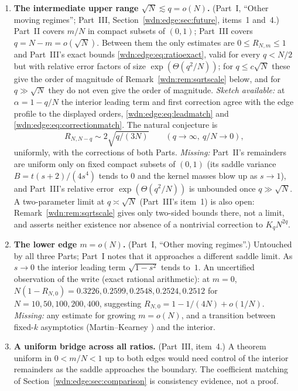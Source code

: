 \documentclass[11pt,letterpaper]{article}
\theoremstyle{remark}\newtheorem{remark}[theorem]{Remark}
\begin{document}
\begin{enumerate}[label=\textbf{\arabic*.},ref=\arabic*,leftmargin=*]
\item\label{wdn:q:gap} \textbf{The intermediate upper range $\sqrt N\lesssim q=o(N)$.} (Part~I, ``Other moving regimes''; Part~III, Section~\ref{wdn:edge:sec:future}, items~1 and~4.) Part~II covers $m/N$ in compact subsets of $(0,1)$; Part~III covers $q=N-m=o(\sqrt N)$. Between them the only estimates are $0\le R_{N,m}\le1$ and Part~III's exact bounds \eqref{wdn:edge:eq:ratioexact}, valid for every $q<N/2$ but with relative error factors of size $\exp(\Theta(q^2/N))$; for $q\le c\sqrt N$ these give the order of magnitude of Remark~\ref{wdn:rem:sqrtscale} below, and for $q\gg\sqrt N$ they do not even give the order of magnitude. \emph{Sketch available:} at $\alpha=1-q/N$ the interior leading term and first correction agree with the edge profile to the displayed orders, \eqref{wdn:edge:eq:leadmatch} and \eqref{wdn:edge:eq:correctionmatch}. The natural conjecture is
\[
 R_{N,N-q}\sim2\sqrt{q/(3N)}\qquad(q\to\infty,\ q/N\to0),
\]
uniformly, with the corrections of both Parts. \emph{Missing:} Part~II's remainders are uniform only on fixed compact subsets of $(0,1)$ (its saddle variance $B=t(s+2)/(4s^4)$ tends to $0$ and the kernel masses blow up as $s\to1$), and Part~III's relative error $\exp(\Theta(q^2/N))$ is unbounded once $q\gg\sqrt N$. A two-parameter limit at $q\asymp\sqrt N$ (Part~III's item~1) is also open: Remark~\ref{wdn:rem:sqrtscale} gives only two-sided bounds there, not a limit, and asserts neither existence nor absence of a nontrivial correction to $K_qN^{2q}$.
\item\label{wdn:q:lower} \textbf{The lower edge $m=o(N)$.} (Part~I, ``Other moving regimes''.) Untouched by all three Parts; Part~I notes that it approaches a different saddle limit. As $s\to0$ the interior leading term $\sqrt{1-s^2}$ tends to~$1$. An uncertified observation of the write (exact rational arithmetic): at $m=0$, $N(1-R_{N,0})=0.3226,0.2599,0.2548,0.2524,0.2512$ for $N=10,50,100,200,400$, suggesting $R_{N,0}=1-1/(4N)+o(1/N)$. \emph{Missing:} any estimate for growing $m=o(N)$, and a transition between fixed-$k$ asymptotics (Martin--Kearney \cite{MK}) and the interior.
\item\label{wdn:q:bridge} \textbf{A uniform bridge across all ratios.} (Part~III, item~4.) A theorem uniform in $0<m/N<1$ up to both edges would need control of the interior remainders as the saddle approaches the boundary. The coefficient matching of Section~\ref{wdn:edge:sec:comparison} is consistency evidence, not a proof.

\end{enumerate}
\end{document}
